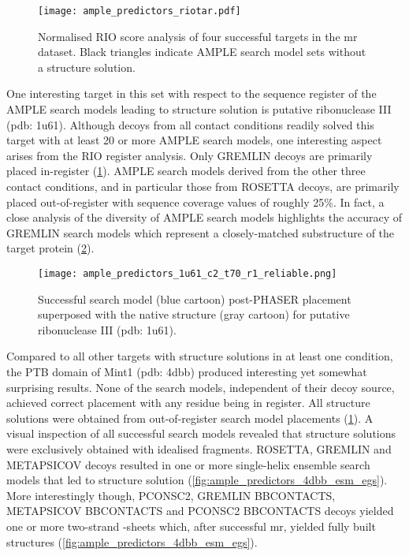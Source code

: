 \begin{figure}[H]
    \centering
    \texttt{[image: ample\_predictors\_riotar.pdf]}
    \caption{Normalised RIO score analysis of four successful targets in the \gls{mr} dataset. Black triangles indicate AMPLE search model sets without a structure solution.}
    \label{fig:ample_predictor_riotar}
\end{figure}

One interesting target in this set with respect to the sequence register of the AMPLE search models leading to structure solution is putative ribonuclease III (\gls{pdb}: 1u61). Although decoys from all contact conditions readily solved this target with at least 20 or more AMPLE search models, one interesting aspect arises from the RIO register analysis. Only GREMLIN decoys are primarily placed in-register (\cref{fig:ample_predictor_riotar}). AMPLE search models derived from the other three contact conditions, and in particular those from ROSETTA decoys, are primarily placed out-of-register with sequence coverage values of roughly 25\%. In fact, a close analysis of the diversity of AMPLE search models highlights the accuracy of GREMLIN search models which represent a closely-matched substructure of the target protein (\cref{fig:ample_predictors_1u61_c2_t70_r1_reliable}).  

\begin{figure}[H]
    \centering
    \texttt{[image: ample\_predictors\_1u61\_c2\_t70\_r1\_reliable.png]}
    \caption{Successful search model (blue cartoon) post-PHASER placement superposed with the native structure (gray cartoon) for putative ribonuclease III (\gls{pdb}: 1u61).}
    \label{fig:ample_predictors_1u61_c2_t70_r1_reliable}
\end{figure}

Compared to all other targets with structure solutions in at least one condition, the PTB domain of Mint1 (\gls{pdb}: 4dbb) produced interesting yet somewhat surprising results. None of the search models, independent of their decoy source, achieved correct placement with any residue being in register. All structure solutions were obtained from out-of-register search model placements (\cref{fig:ample_predictor_riotar}). A visual inspection of all successful search models revealed that structure solutions were exclusively obtained with idealised fragments. ROSETTA, GREMLIN and METAPSICOV decoys resulted in one or more single-helix ensemble search models that led to structure solution (\cref{fig:ample_predictors_4dbb_esm_egs}). More interestingly though, PCONSC2, GREMLIN BBCONTACTS, METAPSICOV BBCONTACTS and PCONSC2 BBCONTACTS decoys yielded one or more two-strand \textbeta-sheets which, after successful \gls{mr}, yielded fully built structures (\cref{fig:ample_predictors_4dbb_esm_egs}).

